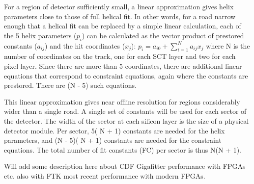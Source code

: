 \noindent For a region of detector sufficiently small, a linear approximation gives helix parameters close to those of full helical fit. In other words, for a road narrow enough that a helical fit can be replaced by a simple linear calculation, each of the 5 helix parameters ($p_i$) can be calculated as the vector product of prestored constants ($a_{ij}$) and the hit coordinates ($x_j$): $p_i = a_{i0} + \sum_{i=1}^{N} a_{ij}x_{j}$  where N is the number of coordinates on the track, one for each SCT layer and two for each pixel layer.  Since there are more than 5 coordinates, there are additional linear equations that correspond to constraint equations, again where the constants are prestored.  There are (N - 5) such equations.  

\noindent This linear approximation gives near offline resolution for regions considerably wider than a single road.  A single set of constants will be used for each sector of the detector. The width of the sector at each silicon layer is the size of a physical detector module.  Per sector, 5( N + 1) constants are needed for the helix parameters, and (N - 5)( N + 1) constants are needed for the constraint equations.  The total number of fit constants (FC) per sector is thus N(N + 1).

\noindent Will add some description here about CDF Gigafitter performance with FPGAs~\cite{bib:Ann-09} etc. also with FTK most recent performance with modern FPGAs.